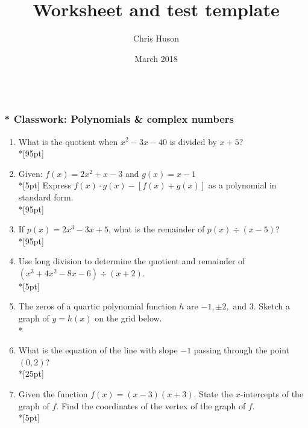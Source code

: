 \documentclass[12pt, oneside]{article}
\title{Worksheet and test template}
\author{Chris Huson}
\date{March 2018}
\begin{document}
\subsubsection*{\\* Classwork: Polynomials \& complex numbers}

\begin{enumerate}

\vspace{0.5 cm}


\item What is the quotient when $x^2-3x-40$ is divided by $x + 5$?\\*[95pt]

\item Given: $f(x)=2x^2+ x - 3$ and $g(x)=x-1$\\*[5pt]
Express $f(x) \cdot g(x) - [f(x) + g(x)]$ as a polynomial in standard form.\\*[95pt] %

\item If $p(x)=2x^3-3x+5$, what is the remainder of $p(x) \div (x-5)$? %
\\*[95pt]

\item Use long division to determine the quotient and remainder of $(x^3+4x^2-8x-6) \div (x+2)$.\\*[5pt]

\newpage

\item The zeros of a quartic polynomial function $h$ are  $-1,\pm 2, \text{ and } 3$. Sketch a graph of $y = h(x)$ on the grid below.\\*
\begin{center}
\end{center}

\item What is the equation of the line with slope $-1$ passing through the point $(0, 2)$?\\*[25pt]


\item Given the function $f(x)=(x-3)(x+3)$. State the $x$-intercepts of the graph of $f$. Find the coordinates of the vertex of the graph of $f$.\\*[5pt]


\newpage


\end{enumerate}
\end{document}
